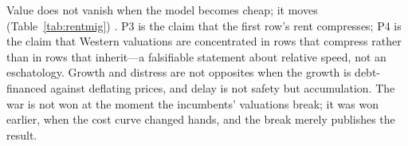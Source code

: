 Value does not vanish when the model becomes cheap; it moves (Table~\ref{tab:rentmig}) . P3 is the claim that the first row's rent compresses; P4 is the claim that Western valuations are concentrated in rows that compress rather than in rows that inherit---a falsifiable statement about relative speed, not an eschatology. Growth and distress are not opposites when the growth is debt-financed against deflating prices, and delay is not safety but accumulation. The war is not won at the moment the incumbents' valuations break; it was won earlier, when the cost curve changed hands, and the break merely publishes the result.
